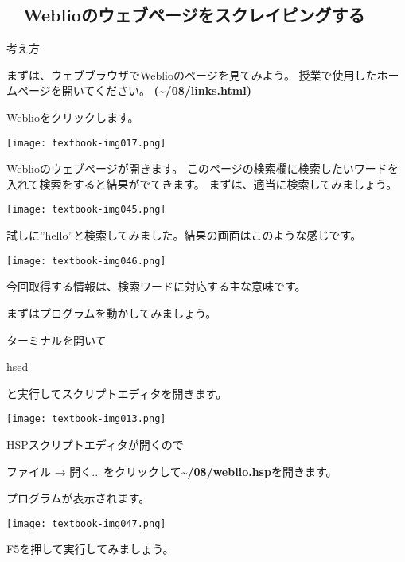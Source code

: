 
\clearpage\subsection*{\theExercise　Weblioのウェブページをスクレイピングする}
\addtocounter{Exercise}{-1}\label{E:Weblio}
\noindent 考え方

まずは、ウェブブラウザでWeblioのページを見てみよう。
授業で使用したホームページを開いてください。
\textbf{({\textasciitilde}/08/links.html)}

Weblioをクリックします。

\begin{center}
    \texttt{[image: textbook-img017.png]}
\end{center}

Weblioのウェブページが開きます。
このページの検索欄に検索したいワードを入れて検索をすると結果がでてきます。
まずは、適当に検索してみましょう。

\begin{center}
    \texttt{[image: textbook-img045.png]}
\end{center}

\clearpage
試しに”hello”と検索してみました。結果の画面はこのような感じです。
\begin{center}
    \texttt{[image: textbook-img046.png]}
\end{center}
今回取得する情報は、検索ワードに対応する主な意味です。

まずはプログラムを動かしてみましょう。

ターミナルを開いて

hsed

と実行してスクリプトエディタを開きます。

\begin{center}
    \texttt{[image: textbook-img013.png]}
\end{center}

\clearpage
HSPスクリプトエディタが開くので

ファイル → 開く..\ をクリックして\textbf{{\textasciitilde}/08/weblio.hsp}を開きます。

プログラムが表示されます。

\begin{center}
    \texttt{[image: textbook-img047.png]}
\end{center}

F5を押して実行してみましょう。

